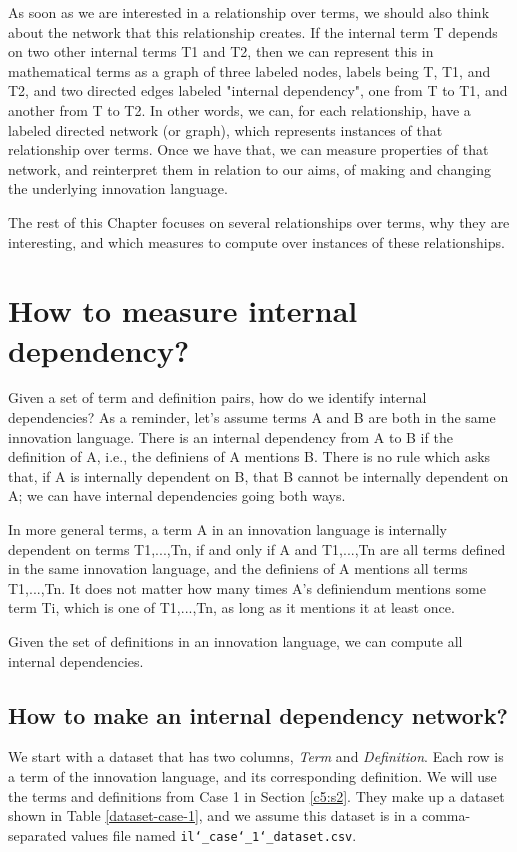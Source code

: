 As soon as we are interested in a relationship over terms, we should also think about the network that this relationship creates. If the internal term T depends on two other internal terms T1 and T2, then we can represent this in mathematical terms as a graph of three labeled nodes, labels being T, T1, and T2, and two directed edges labeled "internal dependency", one from T to T1, and another from T to T2. In other words, we can, for each relationship, have a labeled directed network (or graph), which represents instances of that relationship over terms. Once we have that, we can measure properties of that network, and reinterpret them in relation to our aims, of making and changing the underlying innovation language. 

The rest of this Chapter focuses on several relationships over terms, why they are interesting, and which measures to compute over instances of these relationships.


\section{How to measure internal dependency?}
\label{c7:s3}
Given a set of term and definition pairs, how do we identify internal dependencies? As a reminder, let's assume terms A and B are both in the same innovation language. There is an internal dependency from A to B if the definition of A, i.e., the definiens of A mentions B. There is no rule which asks that, if A is internally dependent on B, that B cannot be internally dependent on A; we can have internal dependencies going both ways.

In more general terms, a term A in an innovation language is internally dependent on terms T1,...,Tn, if and only if A and T1,...,Tn are all terms defined in the same innovation language, and the definiens of A mentions all terms T1,...,Tn. It does not matter how many times A's definiendum mentions some term Ti, which is one of T1,...,Tn, as long as it mentions it at least once.

Given the set of definitions in an innovation language, we can compute all internal dependencies.

\subsection{How to make an internal dependency network?}
\label{c7:s3:ss1}
We start with a dataset that has two columns, \textit{Term} and \textit{Definition}. Each row is a term of the innovation language, and its corresponding definition. We will use the terms and definitions from Case 1 in Section \ref{c5:s2}. They make up a dataset shown in Table \ref{dataset-case-1}, and we assume this dataset is in a comma-separated values file named \texttt{il\char`_case\char`_1\char`_dataset.csv}.


